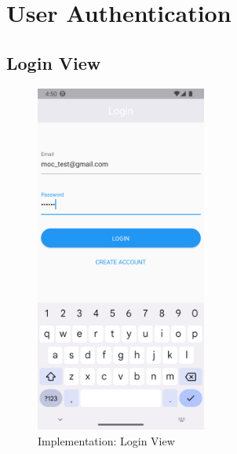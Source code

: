 \documentclass[../thesis.tex]{subfiles}
\begin{document}
\section{User Authentication}
\subsection{Login View}

\begin{figure}[H]
    \centering
    \includegraphics[width=0.50\textwidth]{images/LoginScreen.png}
    \caption{Implementation: Login View}
    \label{fig:LoginScreen}
\end{figure}
\end{document}
